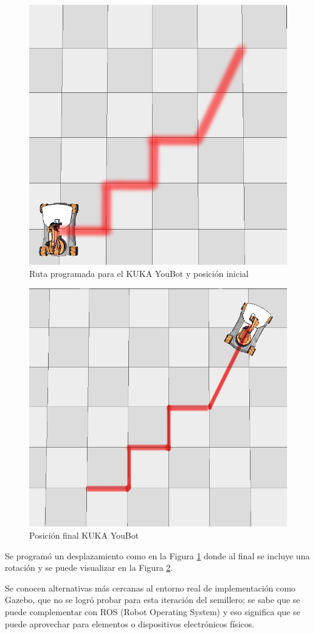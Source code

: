 \documentclass[conference]{IEEEtran}
\begin{document}
\begin{figure}
  \centering
  \includegraphics[width=0.6\linewidth]{figures/kuka_init_pos.jpg}
  \caption{Ruta programada para el KUKA YouBot y posición inicial}
  \label{fig:kukaroute}
\end{figure}

\begin{figure}
  \centering
  \includegraphics[width=0.6\linewidth]{figures/kuka_final_pos.jpg}
  \caption{Posición final KUKA YouBot}
  \label{fig:kukafinal}
\end{figure}

Se programó un desplazamiento como en la Figura \ref{fig:kukaroute} donde al final
se incluye una rotación y se puede visualizar en la Figura \ref{fig:kukafinal}.


Se conocen alternativas más cercanas al entorno real de implementación como
Gazebo, que no se logró probar para esta iteración del semillero; se sabe que se puede
complementar con ROS (Robot Operating System) y eso significa que se puede aprovechar
para elementos o dispositivos electrónicos físicos.
\end{document}
